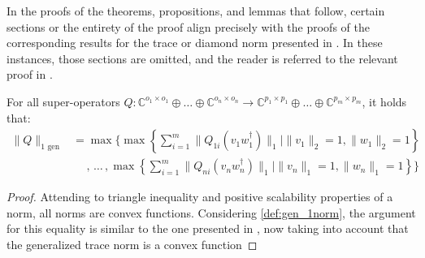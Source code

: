 In the proofs of the theorems, propositions, and lemmas that follow, certain sections or the entirety of the proof align precisely with the proofs of the corresponding results for the trace or diamond norm presented in \cite{watrous2018theory}. In these instances, those sections are omitted, and the reader is referred to the relevant proof in \cite{watrous2018theory}.

\begin{proposition} \label{prop:uv*}
  For all super-operators $Q: \mathbb{C}^{o_1 \times o_1} \oplus \ldots \oplus \mathbb{C}^{o_n \times o_n}  \rightarrow \mathbb{C}^{p_1 \times p_1} \oplus \ldots \oplus  \mathbb{C}^{p_m \times p_m}$, it holds that:
  \begin{equation}
    \begin{split}
    \lVert Q \rVert_{1 \text{ gen}} & =  \max  \Bigg\{ \max \left\{ \sum_{i=1}^{m} \|Q_{1i} (v_1 w_1^\dag)\|_{1}  \mid  \|v_1\|_{2} = 1,   \|w_1\|_{2} =1 \right\} \\
    & \hspace{15pt} ,\hspace{2pt}  \ldots \hspace{2pt}  , \max \left\{ \sum_{i=1}^{m} \|Q_{ni} (v_n w_n^\dag)\|_{1}   \mid \|v_n\|_{1} = 1,  \|w_n\|_{1} = 1\right\} \Bigg\}
    \end{split}
  \end{equation}


  \begin{proof}
    Attending to triangle inequality and positive scalability properties of a norm, all norms are convex functions. Considering \autoref{def:gen_1norm}, the argument for this equality is similar to the one presented in \cite[Proof of Proposition 3.38]{watrous2018theory}, now taking into account that the generalized trace norm is a convex function
  \end{proof}
    
\end{proposition}

